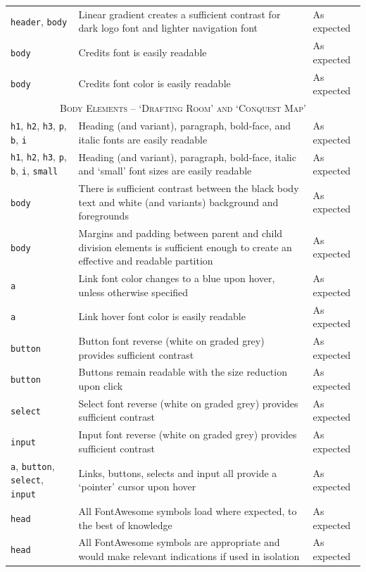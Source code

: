 \documentclass[11pt, english]{article}
\begin{document}
\begin{center}
\begin{longtable}{p{3cm}p{8cm}p{2cm}}
		\texttt{header}, \texttt{body} & Linear gradient creates a sufficient contrast for dark logo font and lighter navigation font & As expected\\
		\texttt{body} & Credits font is easily readable & As expected\\
		\texttt{body} & Credits font color is easily readable & As expected\\
		\hline
		\multicolumn{3}{c}{\textsc{Body Elements -- `Drafting Room' and `Conquest Map'}}\\
		\hline
		\texttt{h1}, \texttt{h2}, \texttt{h3}, \texttt{p}, \texttt{b}, \texttt{i} & Heading (and variant), paragraph, bold-face, and italic fonts are easily readable & As expected\\
		\texttt{h1}, \texttt{h2}, \texttt{h3}, \texttt{p}, \texttt{b}, \texttt{i}, \texttt{small} & Heading (and variant), paragraph, bold-face, italic and `small' font sizes are easily readable & As expected\\
		\texttt{body} & There is sufficient contrast between the black body text and white (and variants) background and foregrounds & As expected\\
		\texttt{body} & Margins and padding between parent and child division elements is sufficient enough to create an effective and readable partition & As expected\\
		\texttt{a} & Link font color changes to a blue upon hover, unless otherwise specified & As expected\\
		\texttt{a} & Link hover font color is easily readable & As expected\\
		\texttt{button} & Button font reverse (white on graded grey) provides sufficient contrast & As expected\\
		\texttt{button} & Buttons remain readable with the size reduction upon click & As expected\\
		\texttt{select} & Select font reverse (white on graded grey) provides sufficient contrast & As expected\\
		\texttt{input} & Input font reverse (white on graded grey) provides sufficient contrast & As expected\\
		\texttt{a}, \texttt{button}, \texttt{select}, \texttt{input} & Links, buttons, selects and input all provide a `pointer' cursor upon hover & As expected\\
		\texttt{head} & All FontAwesome symbols load where expected, to the best of knowledge & As expected\\
		\texttt{head} & All FontAwesome symbols are appropriate and would make relevant indications if used in isolation & As expected\\

\end{longtable}
\end{center}
\end{document}
